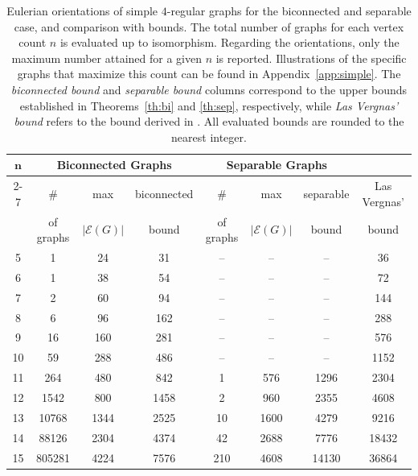 \documentclass{article}
\begin{document}
        \begin{table}[tbh]
        \label{tab:comps}
            \centering
            \begin{tabular}{|c|c|c|c|c|c|c|c|}
                \hline
                \multirow{2}{*}{$\bm{n}$} & \multicolumn{3}{c|}{\textbf{Biconnected Graphs}} & \multicolumn{3}{c|}{\textbf{Separable Graphs}} &  \\ \cline{2-7}
                & $\#$  & max  & biconnected & $\#$  & max  & separable & Las Vergnas' \\
                & of graphs & $|\mathcal{E}(G)|$ & bound & of graphs & $|\mathcal{E}(G)|$ &   bound & bound \\
                \hline
                5 & 1 & 24 & 31 & -- & -- & -- & 36 \\ \hline
                6 & 1 & 38 & 54 & -- & -- & -- & 72 \\ \hline
                7 & 2 & 60 & 94 & -- & -- & -- & 144 \\ \hline
                8 & 6 & 96 & 162 & -- & -- & -- & 288 \\ \hline
                9 & 16 & 160 & 281 & -- & -- & -- & 576 \\ \hline
                10 & 59 & 288 & 486 & -- & -- & -- & 1152 \\ \hline
                11 & 264 & 480 & 842 & 1 & 576 & 1296 & 2304 \\ \hline
                12 & 1542 & 800 & 1458 & 2 & 960 & 2355 & 4608 \\ \hline
                13 & 10768 & 1344 & 2525 & 10 & 1600 & 4279 & 9216 \\ \hline
                14 & 88126 & 2304 & 4374 & 42 & 2688 & 7776 & 18432 \\ \hline
                15 & 805281 & 4224 & 7576 & 210 & 4608 & 14130 & 36864 \\ \hline
            \end{tabular}
            \caption{
                Eulerian orientations of simple $4$-regular graphs for the biconnected and separable case, and comparison with bounds.
                The total number of graphs for each vertex count $n$ is evaluated up to isomorphism. 
                Regarding the orientations, only the maximum number attained for a given $n$ is reported. 
                Illustrations of the specific graphs that maximize this count can be found in Appendix~\ref{app:simple}.
                The \textit{biconnected bound} and \textit{separable bound} columns correspond to the upper bounds established in Theorems~\ref{th:bi} and \ref{th:sep}, respectively, while \textit{Las Vergnas' bound} refers to the bound derived in \cite{LasVergnas}. 
                All evaluated bounds are rounded to the nearest integer.
            }
        \end{table}
\end{document}
